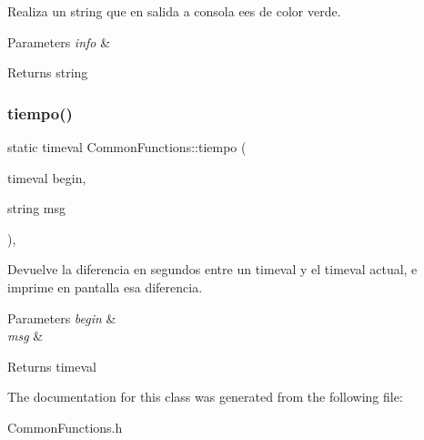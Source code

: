 Realiza un string que en salida a consola ees de color verde. 


\begin{DoxyParams}{Parameters}
{\em info} & \\
\hline
\end{DoxyParams}
\begin{DoxyReturn}{Returns}
string 
\end{DoxyReturn}
\mbox{\label{classCommonFunctions_a72ec70e251bf9b34409318b71e55d34e}} 
\subsubsection{\texorpdfstring{tiempo()}{tiempo()}}
{\footnotesize\ttfamily static timeval Common\+Functions\+::tiempo (\begin{DoxyParamCaption}\item[{timeval}]{begin,  }\item[{string}]{msg }\end{DoxyParamCaption})\hspace{0.3cm}{\ttfamily [inline]}, {\ttfamily [static]}}



Devuelve la diferencia en segundos entre un timeval y el timeval actual, e imprime en pantalla esa diferencia. 


\begin{DoxyParams}{Parameters}
{\em begin} & \\
\hline
{\em msg} & \\
\hline
\end{DoxyParams}
\begin{DoxyReturn}{Returns}
timeval 
\end{DoxyReturn}


The documentation for this class was generated from the following file\+:\begin{DoxyCompactItemize}
\item 
Common\+Functions.\+h\end{DoxyCompactItemize}
